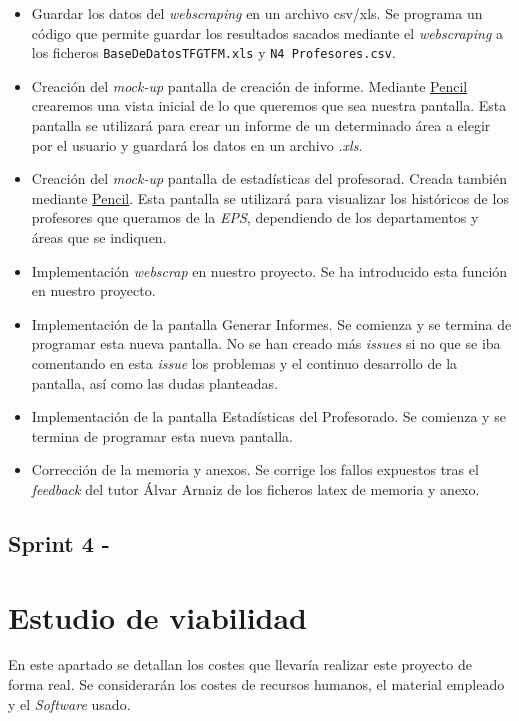 \begin{itemize}
	
	\item Guardar los datos del \emph{webscraping} en un archivo csv/xls. Se programa un código que permite guardar los resultados sacados mediante el \emph{webscraping} a los ficheros \texttt{BaseDeDatosTFGTFM.xls} y \texttt{N4 Profesores.csv}.
	
	\item Creación del \emph{mock-up} pantalla de creación de informe. Mediante \href{https://pencil.evolus.vn/}{Pencil} crearemos una vista inicial de lo que queremos que sea nuestra pantalla. Esta pantalla se utilizará para crear un informe de un determinado área a elegir por el usuario y guardará los datos en un archivo \emph{.xls}.
	
	\item Creación del \emph{mock-up} pantalla de estadísticas del profesorad. Creada también mediante \href{https://pencil.evolus.vn/}{Pencil}. Esta pantalla se utilizará para visualizar los históricos de los profesores que queramos de la \emph{EPS}, dependiendo de los departamentos y áreas que se indiquen.
	
	\item Implementación \emph{webscrap} en nuestro proyecto. Se ha introducido esta función en nuestro proyecto.
	
	\item Implementación de la pantalla Generar Informes. Se comienza y se termina de programar esta nueva pantalla. No se han creado más \emph{issues} si no que se iba comentando en esta \emph{issue} los problemas y el continuo desarrollo de la pantalla, así como las dudas planteadas.
	
	\item Implementación de la pantalla Estadísticas del Profesorado. Se comienza y se termina de programar esta nueva pantalla.
	
	\item Corrección de la memoria y anexos. Se corrige los fallos expuestos tras el \emph{feedback} del tutor Álvar Arnaiz de los ficheros latex de memoria y anexo.
	
\end{itemize}

\subsection{Sprint 4 - }

\section{Estudio de viabilidad}
En este apartado se detallan los costes que llevaría realizar este proyecto de forma real. Se considerarán los costes de recursos humanos, el material empleado y el \emph{Software} usado. 

